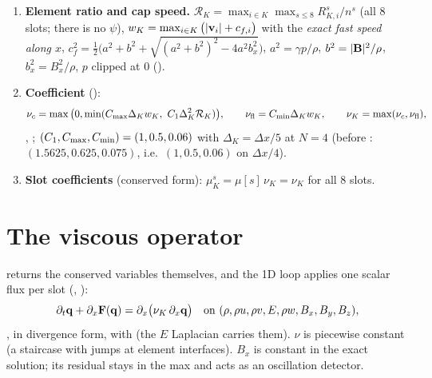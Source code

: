 \documentclass[10pt]{article}
\begin{document}
\begin{enumerate}[leftmargin=*]
\[\]
with  (in the code: $10^3\cdot$ times the built-in $10^{-3}$).
\item \textbf{Element ratio and cap speed.}
$\mathcal R_K=\max_{i\in K}\max_{s\le 8} R^s_{K,i}/n^s$ (all 8 slots; there is no $\psi$),
$w_K=\max_{i\in K}\big(|\mathbf{v}_i|+c_{f,i}\big)$ with the \emph{exact fast speed along $x$},
$c_f^2=\tfrac12\big(a^2+b^2+\sqrt{(a^2+b^2)^2-4a^2b_x^2}\big)$, $a^2=\gamma p/\rho$, $b^2=|\mathbf{B}|^2/\rho$,
$b_x^2=B_x^2/\rho$, $p$ clipped at 0 ().
\item \textbf{Coefficient} ():
\[
\nuc=\max\big(0,\min(\Cmax\Delta_Kw_K,\ \Cone\Delta_K^2\mathcal R_K)\big),\qquad
\nufl=\Cmin\Delta_Kw_K,\qquad \nu_K=\max(\nuc,\nufl),
\]
, ; $(C_1,C_{\max},C_{\min})=(1,0.5,0.06)$
with $\Delta_K=\Delta x/5$ at $N=4$ (before : $(1.5625,0.625,0.075)$, i.e.\ $(1,0.5,0.06)$ on $\Delta x/4$).
\item \textbf{Slot coefficients} (conserved form): $\mu^s_K=\mu[s]\,\nu_K=\nu_K$ for all 8 slots.
\end{enumerate}

\section{The viscous operator}
 returns the conserved variables themselves, and the 1D loop applies one
scalar flux per slot (, ):
\[
\partial_t\mathbf{q}+\partial_x\mathbf{F}(\mathbf{q})=\partial_x\big(\nu_K\,\partial_x\mathbf{q}\big)\quad\text{on }(\rho,\rho u,\rho v,E,\rho w,B_x,B_y,B_z),
\]
, in divergence form, with  (the $E$ Laplacian carries them). $\nu$ is piecewise constant (a staircase
with jumps at element interfaces). $B_x$ is constant in the exact solution; its residual stays in the
max and acts as an oscillation detector.
\end{document}
